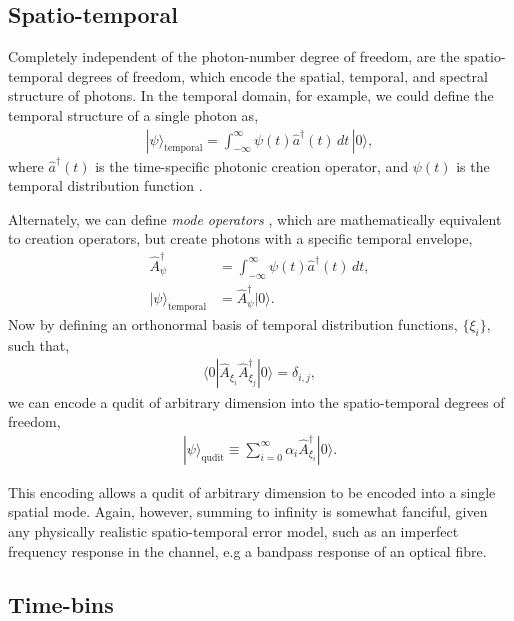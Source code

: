\documentclass[aps,rmp,twocolumn,amsmath,amssymb,nofootinbib,superscriptaddress]{revtex4}
\newcommand{\bra}[1]{\langle#1|}
\newcommand{\ket}[1]{|#1\rangle}
\begin{document}
\subsection{Spatio-temporal}

Completely independent of the photon-number degree of freedom, are the spatio-temporal degrees of freedom, which encode the spatial, temporal, and spectral structure of photons. In the temporal domain, for example, we could define the temporal structure of a single photon as,
\begin{align}
\ket\psi_\mathrm{temporal} = \int_{-\infty}^\infty \psi(t) \hat{a}^\dag(t)\,dt\,\ket{0},
\end{align}
where $\hat{a}^\dag(t)$ is the time-specific photonic creation operator, and $\psi(t)$ is the temporal distribution function \cite{bib:RohdeFreqTemp05}.

Alternately, we can define \emph{mode operators} \cite{bib:RohdeMauererSilberhorn07}, which are mathematically equivalent to creation operators, but create photons with a specific temporal envelope,
\begin{align}
\hat{A}^\dag_\psi &= \int_{-\infty}^\infty \psi(t) \hat{a}^\dag(t)\,dt, \nonumber \\
\ket\psi_\mathrm{temporal} &= \hat{A}^\dag_\psi \ket{0}.
\end{align}
Now by defining an orthonormal basis of temporal distribution functions, $\{\xi_i\}$, such that,
\begin{align}
\bra{0} \hat{A}_{\xi_i} \hat{A}^\dag_{\xi_j}\ket{0} = \delta_{i,j},
\end{align}
we can encode a qudit of arbitrary dimension into the spatio-temporal degrees of freedom,
\begin{align}
\ket\psi_\mathrm{qudit} \equiv \sum_{i=0}^\infty \alpha_i \hat{A}^\dag_{\xi_i} \ket{0}.
\end{align}

This encoding allows a qudit of arbitrary dimension to be encoded into a single spatial mode. Again, however, summing to infinity is somewhat fanciful, given any physically realistic spatio-temporal error model, such as an imperfect frequency response in the channel, e.g a bandpass response of an optical fibre.

%
%

\subsection{Time-bins} \label{sec:time_bin}
\end{document}
